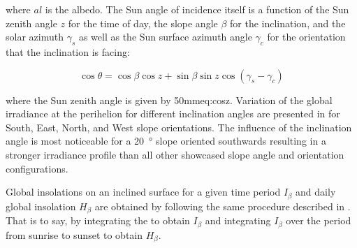 where $al$ is the albedo. The Sun angle of incidence itself is a function of the Sun zenith angle $z$ for the time of day, the slope angle $\beta$ for the inclination, and the solar azimuth $\gamma_{s}$ as well as the Sun surface azimuth angle $\gamma_{c}$ for the orientation that the inclination is facing:

\begin{equation}
  \label{eq:costheta}
  \cos{\theta} = \cos{\beta}\cos{z} +  \sin{\beta}\sin{z}\cos{(\gamma_{s} - \gamma_{c})}
\end{equation}

where the Sun zenith angle is given by 50mm{eq:cosz}. Variation of the global irradiance at the perihelion for different inclination angles are presented in  for South, East, North, and West slope orientations. The influence of the inclination angle is most noticeable for a \SI{20}{\degree} slope oriented southwards resulting in a stronger irradiance profile than all other showcased slope angle and orientation configurations.


Global insolations on an inclined surface for a given time period $I_{\beta}$ and daily global insolation $H_{\beta}$ are obtained by following the same procedure described in . That is to say, by integrating the  to obtain $I_{\beta}$ and integrating $I_{\beta}$ over the period from sunrise to sunset to obtain $H_{\beta}$.



